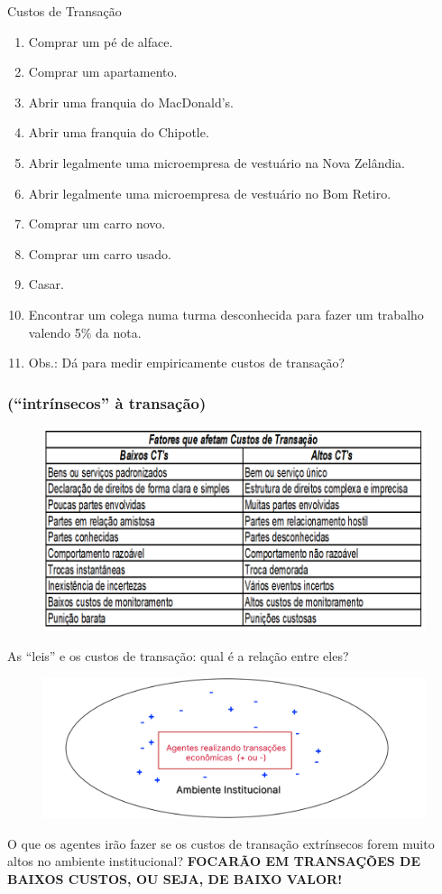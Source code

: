 \documentclass[a4paper,12pt]{article}[abntex2]
\begin{document}
Custos de Transação\begin{enumerate}
    \item Comprar um pé de alface.
    \item Comprar um apartamento.
    \item Abrir uma franquia do MacDonald’s.
    \item Abrir uma franquia do Chipotle.
    \item Abrir legalmente uma microempresa de vestuário na Nova Zelândia.
    \item Abrir legalmente uma microempresa de vestuário no Bom Retiro.
    \item Comprar um carro novo.
    \item Comprar um carro usado.
    \item Casar.
    \item Encontrar um colega numa turma desconhecida para fazer um trabalho valendo 5\% da nota.
    \item Obs.: Dá para medir empiricamente custos de transação?
\end{enumerate}

\subsubsection{\textbf{(“intrínsecos” à transação)}}
\begin{figure}[H]
    \centering
    \includegraphics[width=0.7\linewidth]{Imagens/a5i1.png}
\end{figure}

As “leis” e os custos de transação: qual é a relação entre eles?

\begin{figure}[H]
    \centering
    \includegraphics[width=0.75\linewidth]{Imagens/a5i2.png}
\end{figure}
O que os agentes irão fazer se os custos de transação extrínsecos forem muito altos no ambiente institucional? 
\textbf{FOCARÃO EM TRANSAÇÕES DE BAIXOS CUSTOS, OU SEJA, DE BAIXO VALOR!}
\newpage
\end{document}
